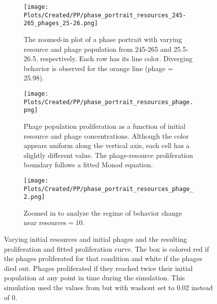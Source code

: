 \begin{figure}[]
    \centering
    \begin{subfigure}{0.49\linewidth}
        \centering
        \texttt{[image: Plots/Created/PP/phase\_portrait\_resources\_245-265\_phages\_25-26.png]}
        \caption{
            The zoomed-in plot of a phase portrait with varying resource and phage population from 245-265 and 25.5-26.5, respectively. 
            Each row has its line color. 
            Diverging behavior is observed for the orange line (phage = 25.98). 
        }
        \label{fig:created:phase_portrait_resources_245-265_phages_25-26}
    \end{subfigure}
    \hfill
    \begin{subfigure}{0.49\linewidth}
        \centering
        \texttt{[image: Plots/Created/PP/phase\_portrait\_resources\_phage.png]}
        \caption{
            Phage population proliferation as a function of initial resource and phage concentrations. 
            Although the color appears uniform along the vertical axis, each cell has a slightly different value. 
            The phage-resource proliferation boundary follows a fitted Monod equation.
        }
        \label{fig:created:phase_portrait_resources_phage}
    \end{subfigure}
    \hfill
    \begin{subfigure}{0.49\linewidth}
        \centering
        \texttt{[image: Plots/Created/PP/phase\_portrait\_resources\_phage\_2.png]}
        \caption{
        Zoomed in to analyze the regime of behavior change near resources$=10$. 
    }
        \label{fig:created:phase_portrait_resources_phage_2}
    \end{subfigure}
    \caption{
        Varying initial resources and initial phages and the resulting proliferation and fitted proliferation curve. 
        The box is colored red if the phages proliferated for that condition and white if the phages died out. 
        Phages proliferated if they reached twice their initial population at any point in time during the simulation. 
        This simulation used the values from  but with washout set to 0.02 instead of 0. 
    }
    \label{fig:created:phase_portrait_resource_phage_proliferate}
\end{figure}

